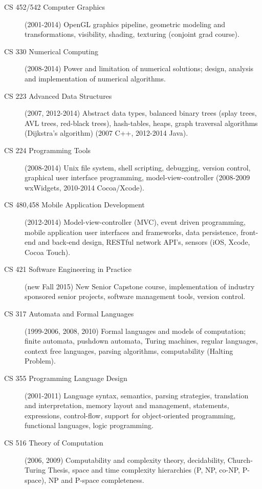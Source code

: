 \documentclass[10pt]{article}
\begin{document}
\begin{description}
  \item[CS 452/542 Computer Graphics] (2001-2014) OpenGL %
      graphics pipeline, geometric modeling and
      transformations, visibility, shading, texturing (conjoint grad course).
  \item[CS 330 Numerical Computing] (2008-2014) Power and limitation of numerical solutions; design, analysis 
      and implementation of numerical algorithms.
  \item[CS 223 Advanced Data Structures] (2007, 2012-2014) Abstract data types, balanced binary trees (splay
     trees, AVL trees, red-black trees), hash-tables, heaps, graph traversal algorithms (Dijkstra's algorithm) 
     (2007 C++, 2012-2014 Java).
  \item[CS 224 Programming Tools] (2008-2014) Unix file system, shell scripting, debugging, version control,
     graphical user interface programming, model-view-controller (2008-2009 wxWidgets, 2010-2014 Cocoa/Xcode).
  \item[CS 480,458 Mobile Application Development] (2012-2014) Model-view-controller (MVC), event driven
     programming, mobile application user interfaces and frameworks, data persistence, 
     front-end and back-end design, RESTful network API's, sensors (iOS, Xcode, Cocoa Touch).
  \item[CS 421 Software Engineering in Practice] (new Fall 2015) New Senior Capstone course, implementation of
     industry sponsored senior projects, software management tools, version control.
  \item[CS 317 Automata and Formal Languages] (1999-2006, 2008, 2010) Formal languages and 
     models of computation; finite automata, 
     pushdown automata, Turing machines, regular languages, context free languages, parsing algorithms, 
     computability (Halting Problem).
  \item[CS 355 Programming Language Design] (2001-2011) Language syntax, semantics, parsing strategies, translation
     and interpretation, memory layout and management, statements, expressions, control-flow, support
     for object-oriented programming, functional languages, logic programming.
  \item[CS 516 Theory of Computation] (2006, 2009) Computability and complexity theory, decidability, 
      Church-Turing Thesis, space and time complexity hierarchies (P, NP, co-NP, P-space), NP and P-space
      completeness.

\end{description}
\end{document}
